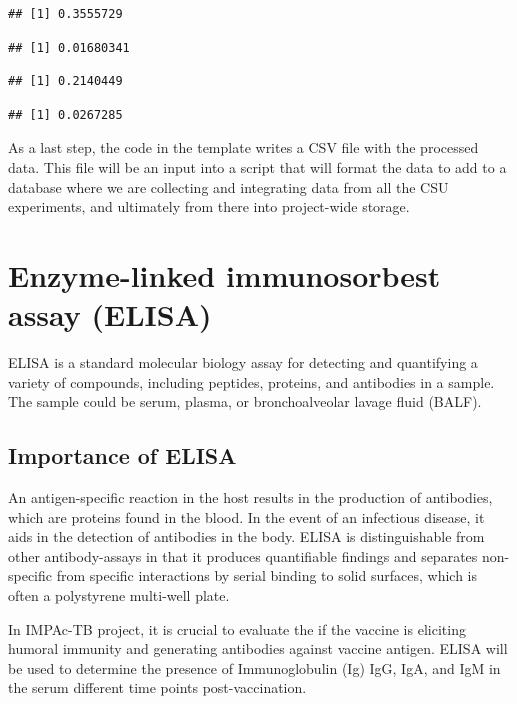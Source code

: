\documentclass[
]{book}
\begin{document}
\begin{verbatim}
## [1] 0.3555729
\end{verbatim}

\begin{verbatim}
## [1] 0.01680341
\end{verbatim}

\begin{verbatim}
## [1] 0.2140449
\end{verbatim}

\begin{verbatim}
## [1] 0.0267285
\end{verbatim}

As a last step, the code in the template writes a CSV file with the processed
data. This file will be an input into a script that will format the data to
add to a database where we are collecting and integrating data from all the CSU
experiments, and ultimately from there into project-wide storage.

\hypertarget{enzyme-linked-immunosorbest-assay-elisa}{%
\chapter{Enzyme-linked immunosorbest assay (ELISA)}\label{enzyme-linked-immunosorbest-assay-elisa}}

ELISA is a standard molecular biology assay for detecting and quantifying a
variety of compounds, including peptides, proteins, and antibodies in a sample.
The sample could be serum, plasma, or bronchoalveolar lavage fluid (BALF).

\hypertarget{importance-of-elisa}{%
\section{\texorpdfstring{\textbf{Importance of ELISA}}{Importance of ELISA}}\label{importance-of-elisa}}

An antigen-specific reaction in the host results in the production of antibodies, which are proteins found in the blood. In the event of an infectious disease,
it aids in the detection of antibodies in the body. ELISA is distinguishable from other antibody-assays in that it produces quantifiable findings and separates non-specific from specific interactions by serial binding to solid surfaces,
which is often a polystyrene multi-well plate.

In IMPAc-TB project, it is crucial to evaluate the if the vaccine is eliciting humoral immunity and generating antibodies against vaccine antigen. ELISA will
be used to determine the presence of Immunoglobulin (Ig) IgG, IgA, and IgM in
the serum different time points post-vaccination.
\end{document}
